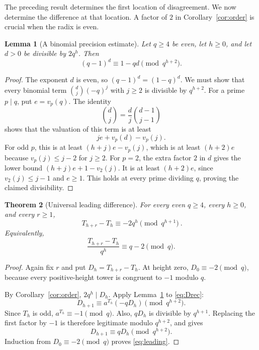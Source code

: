 \documentclass[11pt,a4paper]{article}
\numberwithin{equation}{section}
\theoremstyle{plain}
\newtheorem{theorem}{Theorem}[section]
\newtheorem{lemma}[theorem]{Lemma}
\theoremstyle{definition}
\begin{document}
The preceding result determines the first location of disagreement.
We now determine the difference at that location.  A factor of $2$ in
Corollary~\ref{cor:order} is crucial when the radix is even.

\begin{lemma}[A binomial precision estimate]\label{lem:binomial}
Let $q\ge4$ be even, let $h\ge0$, and let $d>0$ be divisible by
$2q^h$.  Then
\begin{equation}\label{eq:linearized}
 (q-1)^d\equiv1-qd\pmod{q^{h+2}}.
\end{equation}
\end{lemma}
\begin{proof}
The exponent $d$ is even, so $(q-1)^d=(1-q)^d$.
We must show that every binomial term
$\binom dj(-q)^j$ with $j\ge2$ is divisible by $q^{h+2}$.
For a prime $p\mid q$, put $e=v_p(q)$.  The identity
\[
 \binom dj=\frac dj\binom{d-1}{j-1}
\]
shows that the valuation of this term is at least
\[
 je+v_p(d)-v_p(j).
\]
For odd $p$, this is at least $(h+j)e-v_p(j)$, which is at least
$(h+2)e$ because $v_p(j)\le j-2$ for $j\ge2$.
For $p=2$, the extra factor $2$ in $d$ gives the lower bound
$(h+j)e+1-v_2(j)$.  It is at least $(h+2)e$, since
$v_2(j)\le j-1$ and $e\ge1$.
This holds at every prime dividing $q$, proving the claimed divisibility.
\end{proof}

\begin{theorem}[Universal leading difference]\label{thm:leading}
For every even $q\ge4$, every $h\ge0$, and every $r\ge1$,
\begin{equation}\label{eq:leading}
 \boxed{\ T_{h+r}-T_h\equiv-2q^h\pmod{q^{h+1}}\ }.
\end{equation}
Equivalently,
\begin{equation}\label{eq:normalized}
 \frac{T_{h+r}-T_h}{q^h}\equiv q-2\pmod q.
\end{equation}
\end{theorem}
\begin{proof}
Again fix $r$ and put $D_h=T_{h+r}-T_h$.
At height zero, $D_0\equiv-2\pmod q$, because every positive-height
tower is congruent to $-1$ modulo $q$.

By Corollary~\ref{cor:order}, $2q^h\mid D_h$.
Apply Lemma~\ref{lem:binomial} to \eqref{eq:Drec}:
\[
 D_{h+1}\equiv a^{T_h}(-qD_h)\pmod{q^{h+2}}.
\]
Since $T_h$ is odd, $a^{T_h}\equiv-1\pmod q$.
Also, $qD_h$ is divisible by $q^{h+1}$.  Replacing the first factor
by $-1$ is therefore legitimate modulo $q^{h+2}$, and gives
\[
 D_{h+1}\equiv qD_h\pmod{q^{h+2}}.
\]
Induction from $D_0\equiv-2\pmod q$ proves \eqref{eq:leading}.
\end{proof}
\end{document}

